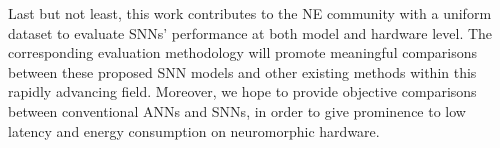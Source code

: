 Last but not least, this work contributes to the NE community with a uniform dataset to evaluate SNNs' performance at both model and hardware level.
The corresponding evaluation methodology will promote meaningful comparisons between these proposed SNN models and other existing methods within this rapidly advancing field.
Moreover, we hope to provide objective comparisons between conventional ANNs and SNNs, in order to give prominence to low latency and energy consumption on neuromorphic hardware.

